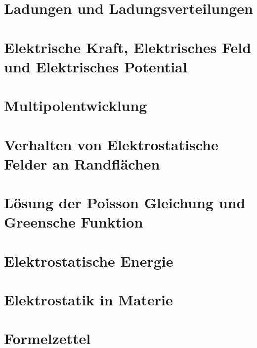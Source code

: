 \section{Ladungen und Ladungsverteilungen}%
\label{sub:Ladungen-und-Ladungsverteilungen}


\newpage
\section{Elektrische Kraft, Elektrisches Feld und Elektrisches Potential}%
\label{sub:Ladungen-und-Ladungsverteilungen}


\newpage
\section{Multipolentwicklung}%
\label{sub:Multipolentwicklung}


\newpage
\section{Verhalten von Elektrostatische Felder an Randflächen}%
\label{sub:randflaechen}


\newpage
\section{Lösung der Poisson Gleichung und Greensche Funktion}%
\label{sub:poisson-green}


\newpage
\section{Elektrostatische Energie}%
\label{sub:elektrostatische-energie}


\newpage
\section{Elektrostatik in Materie}%


\newpage
\section{Formelzettel}%


